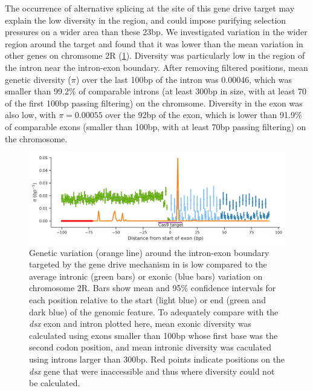 \documentclass[a4paper,11pt,abstracton,hidelinks]{scrartcl}
\begin{document}
The occurrence of alternative splicing at the site of this gene drive target may explain the low diversity in the region, and could impose purifying selection pressures on a wider area than these 23bp.
%
We investigated variation in the wider region around the target and found that it was lower than the mean variation in other genes on chromsome 2R (\ref{dsx1}). 
%
Diversity was particularly low in the region of the intron near the intron-exon boundary.
%
After removing filtered positions, mean genetic diversity ($\pi$) over the last 100bp of the intron was 0.00046, which was smaller than 99.2\% of comparable introns (at least 300bp in size, with at least 70 of the first 100bp passing filtering) on the chromsome.
%
Diversity in the exon was also low, with $\pi = 0.00055$ over the 92bp of the exon, which is lower than 91.9\% of comparable exons (smaller than 100bp, with at least 70bp passing filtering) on the chromosome. 



\begin{figure}[H]
	\begin{center}
		\includegraphics*[width=5.5in]{artwork/temp-cas9dsx/Cas9_target_diversity.jpg}
	\end{center}
	\caption{Genetic variation (orange line) around the intron-exon boundary targeted by the gene drive mechanism in \textcite{kyrou2018} is low compared to the average intronic (green bars) or exonic (blue bars) variation on chromosome 2R. Bars show mean and 95\% confidence intervals for each position relative to the start (light blue) or end (green and dark blue) of the genomic feature. To adequately compare with the \textit{dsx} exon and intron plotted here, mean exonic diversity was calculated using exons smaller than 100bp whose first base was the second codon position, and mean intronic diversity was caculated using introns larger than 300bp. Red points indicate positions on the \textit{dsx} gene that were inaccessible and thus where diversity could not be calculated.}
	\label{dsx1}
\end{figure}
\end{document}
